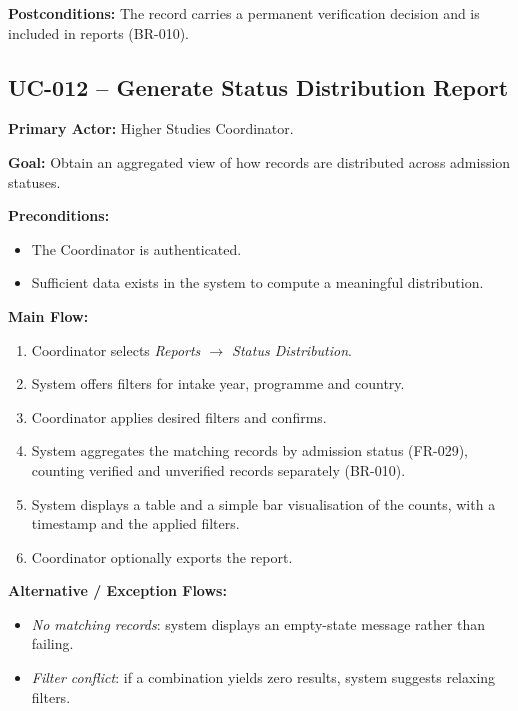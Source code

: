 \documentclass[11pt,a4paper]{article}
\begin{document}
\medskip

\noindent\textbf{Postconditions:} The record carries a permanent verification decision and is included in reports (BR-010).

\subsection{UC-012 -- Generate Status Distribution Report}

\noindent\textbf{Primary Actor:} Higher Studies Coordinator.

\medskip

\noindent\textbf{Goal:} Obtain an aggregated view of how records are distributed across admission statuses.

\medskip

\noindent\textbf{Preconditions:}
\begin{itemize}
  \item The Coordinator is authenticated.
  \item Sufficient data exists in the system to compute a meaningful distribution.
\end{itemize}

\medskip

\noindent\textbf{Main Flow:}
\begin{enumerate}
  \item Coordinator selects \emph{Reports $\rightarrow$ Status Distribution}.
  \item System offers filters for intake year, programme and country.
  \item Coordinator applies desired filters and confirms.
  \item System aggregates the matching records by admission status (FR-029), counting verified and unverified records separately (BR-010).
  \item System displays a table and a simple bar visualisation of the counts, with a timestamp and the applied filters.
  \item Coordinator optionally exports the report.
\end{enumerate}

\medskip

\noindent\textbf{Alternative / Exception Flows:}
\begin{itemize}
  \item \emph{No matching records}: system displays an empty-state message rather than failing.
  \item \emph{Filter conflict}: if a combination yields zero results, system suggests relaxing filters.
\end{itemize}
\end{document}
